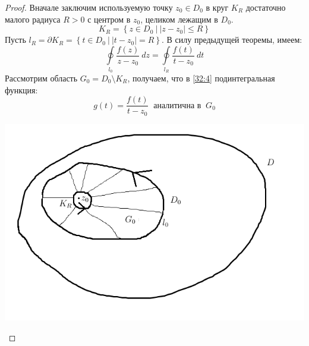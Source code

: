 \documentclass[../../main.tex]{subfiles}
\begin{document}
\begin{proof}
	Вначале заключим используемую точку $z_0 \in D_0$ в круг $K_R$ достаточно 
	малого радиуса $R>0$ с центром в $z_0$, целиком лежащим в $D_0$.
	\[ K_R = \left\lbrace z \in D_0 \ \big| \ |z-z_0| \le R\right\rbrace  \]
	Пусть $l_R = \partial K_R = \left\lbrace t \in D_0 \ \big| \ |t-z_0| = R 
	\right\rbrace $. В силу предыдущей теоремы, имеем:
	\begin{equation}
	\label{32:4}
	\oint \limits_{l_0} \frac{f(z)}{z-z_0} \ dz = \oint \limits_{l_R} 
	\frac{f(t)}{t-z_0} \ dt
	\end{equation}
	Рассмотрим область $G_0 = D_0 \setminus K_R$, получаем, что в \eqref{32:4} 
	подинтегральная функция:
	\[ g(t) = \frac{f(t)}{t-z_0} \ \text{ аналитична в } \ G_0 \]
	\begin{center}
		\includegraphics[width=0.7\linewidth]{lecture32_2}
	\end{center}
	

\end{proof}
\end{document}
